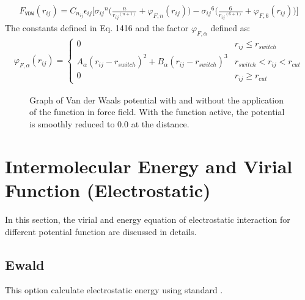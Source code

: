 \documentclass[letterpaper,10pt,english]{sphinxmanual}
\begin{document}
\begin{description}
\begin{equation*}
\begin{split}F_{\texttt{VDW}}(r_{ij}) = C_{n_{ij}}\epsilon_{ij} \Bigg[ {\sigma_{ij}}^{n} \bigg(\frac{n}{{r_{ij}}^{(n+1)}} + \varphi_{F, n} (r_{ij}) \bigg) - {\sigma_{ij}}^{6} \bigg(\frac{6}{{r_{ij}}^{(6+1)}} + \varphi_{F, 6} (r_{ij}) \bigg) \Bigg]\end{split}
\end{equation*}
\sphinxAtStartPar
The constants defined in Eq. 14\sphinxhyphen{}16 and the factor \(\varphi_{F, \alpha}\) defined as:
\begin{equation*}
\begin{split}\varphi_{F, \alpha}(r_{ij}) =
\begin{cases}
  0 & r_{ij} \leq r_{switch} \\
  A_{\alpha} (r_{ij} - r_{switch})^2 + B_{\alpha} (r_{ij} - r_{switch})^3 & r_{switch} < r_{ij} < r_{cut} \\
  0 & r_{ij} \geq r_{cut}
\end{cases}\end{split}
\end{equation*}
\begin{figure}[htbp]
\centering
\capstart

\noindent{}
\caption{Graph of Van der Waals potential with and without the application of the  function in  force field. With the  function active, the potential is smoothly reduced to 0.0 at the  distance.}\label{\detokenize{vdw_energy:id4}}\end{figure}

\end{description}


\chapter{Intermolecular Energy and Virial Function (Electrostatic)}
\label{\detokenize{electrostatic:intermolecular-energy-and-virial-function-electrostatic}}\label{\detokenize{electrostatic::doc}}
\sphinxAtStartPar
In this section, the virial and energy equation of electrostatic interaction for different potential function are discussed in details.


\section{Ewald}
\label{\detokenize{electrostatic:ewald}}
\sphinxAtStartPar
This option calculate electrostatic energy using standard .
\end{document}
